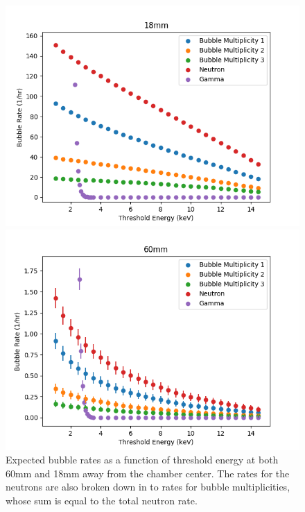 \documentclass[%
12pt,
twoside,
reprint,
amsmath,amssymb,
aps,
]{article}
\begin{document}
	\begin{figure}[t]
		\begin{minipage}{0.5\textwidth}
			\centering
			\includegraphics[width=1.1\linewidth]{Images/18mm_thresh.png}
		\end{minipage}
		\begin{minipage}{0.5\textwidth}
			\centering
			\includegraphics[width=1.1\linewidth]{Images/60mm_thresh.png}
		\end{minipage}
		\caption{\label{tab:table-name} Expected bubble rates as a function of threshold energy at both 60mm and 18mm away from the chamber center. The rates for the neutrons are also broken down in to rates for bubble multiplicities, whose sum is equal to the total neutron rate.}
	\end{figure}
	
\end{document}
